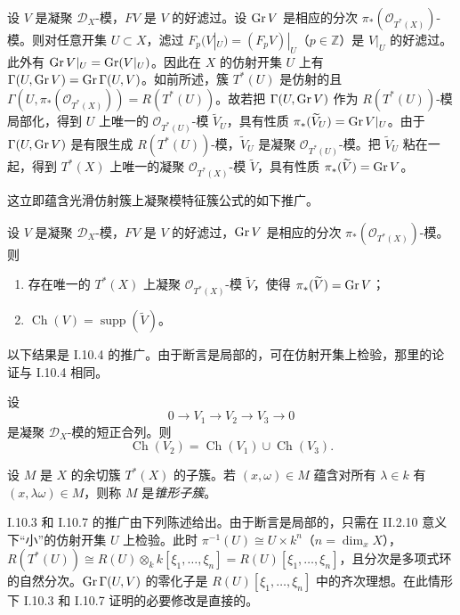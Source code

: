 设 $V$ 是凝聚 $\mathcal{D}_X$-模，$F V$ 是 $V$ 的好滤过。设 $\operatorname{Gr} V$ 是相应的分次 $\pi_*(\mathcal{O}_{T^*(X)})$-模。则对任意开集 $U\subset X$，滤过 $F_p(V|_U)=(F_pV)|_U$（$p\in\mathbb{Z}$）是 $V|_U$ 的好滤过。此外有 $\operatorname{Gr} V|_U=\operatorname{Gr}(V|_U)$。因此在 $X$ 的仿射开集 $U$ 上有 $\Gamma(U,\operatorname{Gr} V)=\operatorname{Gr}\Gamma(U,V)$。如前所述，簇 $T^*(U)$ 是仿射的且 $\Gamma(U,\pi_*(\mathcal{O}_{T^*(X)}))=R(T^*(U))$。故若把 $\Gamma(U,\operatorname{Gr} V)$ 作为 $R(T^*(U))$-模局部化，得到 $U$ 上唯一的 $\mathcal{O}_{T^*(U)}$-模 $\widetilde{V}_U$，具有性质 $\pi_*(\widetilde{V}_U)=\operatorname{Gr} V|_U$。由于 $\Gamma(U,\operatorname{Gr} V)$ 是有限生成 $R(T^*(U))$-模，$\widetilde{V}_U$ 是凝聚 $\mathcal{O}_{T^*(U)}$-模。把 $\widetilde{V}_U$ 粘在一起，得到 $T^*(X)$ 上唯一的凝聚 $\mathcal{O}_{T^*(X)}$-模 $\widetilde V$，具有性质 $\pi_*(\widetilde V)=\operatorname{Gr} V$。

这立即蕴含光滑仿射簇上凝聚模特征簇公式的如下推广。

\begin{proposition}
设 $V$ 是凝聚 $\mathcal{D}_X$-模，$F V$ 是 $V$ 的好滤过，$\operatorname{Gr} V$ 是相应的分次 $\pi_*(\mathcal{O}_{T^*(X)})$-模。则
\begin{enumerate}[label=(\roman*)]
  \item 存在唯一的 $T^*(X)$ 上凝聚 $\mathcal{O}_{T^*(X)}$-模 $\widetilde V$，使得 $\pi_*(\widetilde V)=\operatorname{Gr} V$；
  \item $\operatorname{Ch}(V)=\operatorname{supp}(\widetilde V)$。
\end{enumerate}
\end{proposition}

以下结果是 I.10.4 的推广。由于断言是局部的，可在仿射开集上检验，那里的论证与 I.10.4 相同。

\begin{proposition}
设
$$0\longrightarrow V_1\longrightarrow V_2\longrightarrow V_3\longrightarrow 0$$
是凝聚 $\mathcal{D}_X$-模的短正合列。则
$$\operatorname{Ch}(V_2)=\operatorname{Ch}(V_1)\cup\operatorname{Ch}(V_3).$$
\end{proposition}

设 $M$ 是 $X$ 的余切簇 $T^*(X)$ 的子簇。若 $(x,\omega)\in M$ 蕴含对所有 $\lambda\in k$ 有 $(x,\lambda\omega)\in M$，则称 $M$ 是\emph{锥形子簇}。

I.10.3 和 I.10.7 的推广由下列陈述给出。由于断言是局部的，只需在 II.2.10 意义下“小”的仿射开集 $U$ 上检验。此时 $\pi^{-1}(U)\cong U\times k^n$（$n=\dim_xX$），$R(T^*(U))\cong R(U)\otimes_kk[\xi_1,\dots,\xi_n]=R(U)[\xi_1,\dots,\xi_n]$，且分次是多项式环的自然分次。$\operatorname{Gr}\Gamma(U,V)$ 的零化子是 $R(U)[\xi_1,\dots,\xi_n]$ 中的齐次理想。在此情形下 I.10.3 和 I.10.7 证明的必要修改是直接的。

